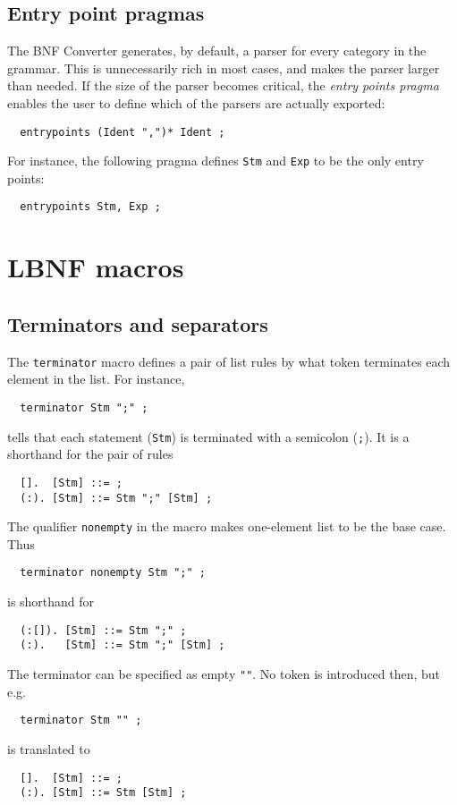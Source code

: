 \documentclass[10pt]{article}
\begin{document}
\subsection{Entry point pragmas}

The BNF Converter generates, by default, a parser for every category in
the grammar. This is unnecessarily rich in most cases, and makes the parser
larger than needed. If the size of the parser becomes critical,
the \textit{entry points pragma} enables the user
to define which of the parsers are actually exported:
\begin{verbatim}
  entrypoints (Ident ",")* Ident ;
\end{verbatim}
For instance, the following pragma defines {\tt Stm} and {\tt Exp} to be
the only entry points:
\begin{verbatim}
  entrypoints Stm, Exp ;
\end{verbatim}


\section{LBNF macros}
\label{macros}

\subsection{Terminators and separators}
\label{terminator}

The \verb$terminator$ macro defines a pair of list rules by what
token terminates each element in the list. For instance,
\begin{verbatim}
  terminator Stm ";" ;
\end{verbatim}
tells that each statement (\verb$Stm$) is terminated with a semicolon
(\verb$;$). It is a shorthand for the pair of rules
\begin{verbatim}
  [].  [Stm] ::= ;
  (:). [Stm] ::= Stm ";" [Stm] ;
\end{verbatim}
The qualifier \verb$nonempty$ in the macro makes one-element list
to be the base case. Thus
\begin{verbatim}
  terminator nonempty Stm ";" ;
\end{verbatim}
is shorthand for
\begin{verbatim}
  (:[]). [Stm] ::= Stm ";" ;
  (:).   [Stm] ::= Stm ";" [Stm] ;
\end{verbatim}
The terminator can be specified as empty \verb$""$. No token is
introduced then, but e.g.
\begin{verbatim}
  terminator Stm "" ;
\end{verbatim}
is translated to
\begin{verbatim}
  [].  [Stm] ::= ;
  (:). [Stm] ::= Stm [Stm] ;
\end{verbatim}
\end{document}
